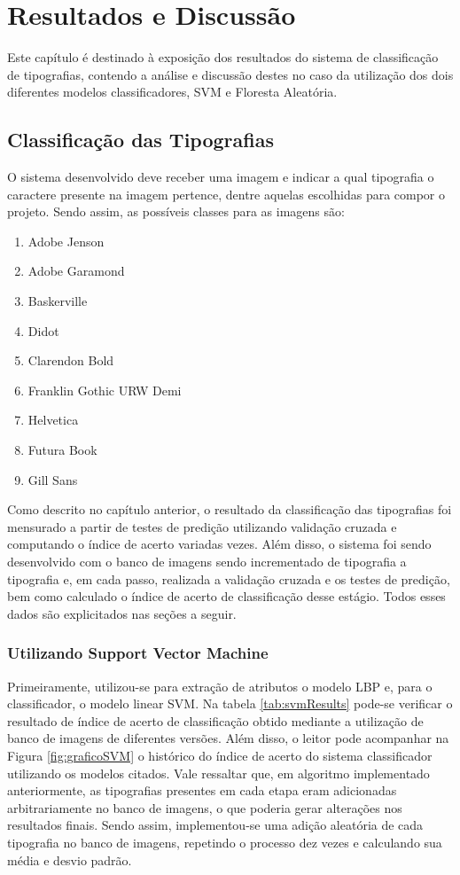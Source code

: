 \chapter{Resultados e Discussão}
\label{ch:Resultados}

Este capítulo é destinado à exposição dos resultados do sistema de classificação de tipografias, contendo a análise e discussão destes no caso da utilização dos dois diferentes modelos classificadores, SVM e Floresta Aleatória.

\section{Classificação das Tipografias}

O sistema desenvolvido deve receber uma imagem e indicar a qual tipografia o caractere presente na imagem pertence, dentre aquelas escolhidas para compor o projeto. Sendo assim, as possíveis classes para as imagens são:

\begin{enumerate}
\item Adobe Jenson
\item Adobe Garamond
\item Baskerville
\item Didot
\item Clarendon Bold
\item Franklin Gothic URW Demi
\item Helvetica
\item Futura Book
\item Gill Sans
\end{enumerate}

Como descrito no capítulo anterior, o resultado da classificação das tipografias foi mensurado a partir de testes de predição utilizando validação cruzada e computando o índice de acerto variadas vezes. Além disso, o sistema foi sendo desenvolvido com o banco de imagens sendo incrementado de tipografia a tipografia e, em cada passo, realizada a validação cruzada e os testes de predição, bem como calculado o índice de acerto de classificação desse estágio. Todos esses dados são explicitados nas seções a seguir.

\subsection{Utilizando Support Vector Machine}

Primeiramente, utilizou-se para extração de atributos o modelo LBP e, para o classificador, o modelo linear SVM. Na tabela \ref{tab:svmResults} pode-se verificar o resultado de índice de acerto de classificação obtido mediante a utilização de banco de imagens de diferentes versões. Além disso, o leitor pode acompanhar na Figura \ref{fig:graficoSVM} o histórico do índice de acerto do sistema classificador utilizando os modelos citados. Vale ressaltar que, em algoritmo implementado anteriormente, as tipografias presentes em cada etapa eram adicionadas arbitrariamente no banco de imagens, o que poderia gerar alterações nos resultados finais. Sendo assim, implementou-se uma adição aleatória de cada tipografia no banco de imagens, repetindo o processo dez vezes e calculando sua média e desvio padrão.

